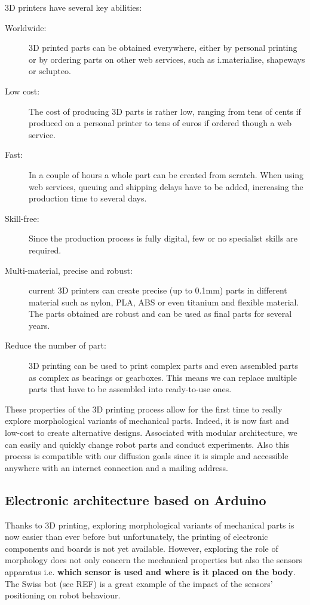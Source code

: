 3D printers have several key abilities:
\begin{description}
    \item[Worldwide:] 3D printed parts can be obtained everywhere, either by personal printing or by ordering parts on other web services, such as i.materialise, shapeways or sclupteo.
    \item[Low cost:] The cost of producing 3D parts is rather low, ranging from tens of cents if produced on a personal printer to tens of euros if ordered though a web service.
    \item[Fast:] In a couple of hours a whole part can be created from scratch. When using web services, queuing and shipping delays have to be added, increasing the production time to several days.
    \item[Skill-free:] Since the production process is fully digital, few or no specialist skills are required.
    \item[Multi-material, precise and robust:] current 3D printers can create precise (up to 0.1mm) parts in different material such as nylon, PLA, ABS or even titanium and flexible material. The parts obtained are robust and can be used as final parts for several years.
    \item[Reduce the number of part:] 3D printing  can be used to print complex parts and even assembled parts as complex as bearings or gearboxes. This means we can replace multiple parts that have to be assembled into ready-to-use ones.
\end{description}

These properties of the 3D printing process allow for the first time to really explore morphological variants of mechanical parts. Indeed, it is now fast and low-cost to create alternative designs. Associated with modular architecture, we can easily and quickly change robot parts and conduct experiments. Also this process is compatible with our diffusion goals since it is simple and accessible anywhere with an internet connection and a mailing address.


\subsection{Electronic architecture based on Arduino} %

Thanks to 3D printing, exploring morphological variants of mechanical parts is now easier than ever before but unfortunately, the printing of electronic components and boards is not yet available. However, exploring the role of morphology does not only concern the mechanical properties but also the sensors apparatus i.e. \textbf{which sensor is used and where is it placed on the body}. The Swiss bot (see REF) is a great example of the impact of the sensors’ positioning on robot behaviour.

